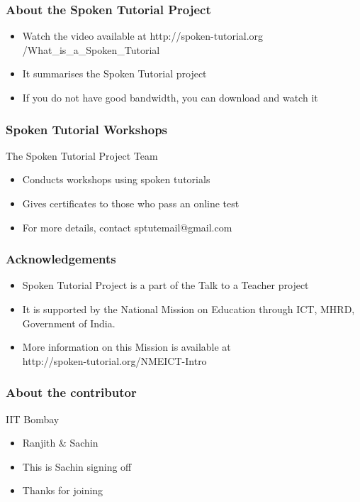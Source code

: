 \documentclass[17pt]{beamer}
\begin{document}


\begin{frame}
  \frametitle{About the Spoken Tutorial Project}
  \begin{itemize}
  \item Watch the video available at {\color{blue}
    http://spoken-tutorial.org /What\_is\_a\_Spoken\_Tutorial}
  \item It summarises the Spoken Tutorial project \pause
  \item If you do not have good bandwidth, you can download and watch it
  \end{itemize}
\end{frame}

\begin{frame}
  \frametitle{Spoken Tutorial Workshops}
  The Spoken Tutorial Project Team
  \begin{itemize}
  \item Conducts workshops using spoken tutorials
  \item Gives certificates to those who pass an online test
  \item For more details, contact sptutemail@gmail.com
  \end{itemize}
\end{frame}

\begin{frame}
  \frametitle{Acknowledgements}
  \begin{itemize}
  \item Spoken Tutorial Project is a part of the Talk to a Teacher
    project
  \item It is supported by the National Mission on Education through
    ICT, MHRD, Government of India.
  \item More information on this Mission is available at \\
    \small {\color{blue} http://spoken-tutorial.org/NMEICT-Intro}
  \end{itemize}
\end{frame}

\begin{frame}
  \frametitle{About the contributor}
  IIT Bombay
  \begin{itemize}[<+-|alert@+>]
  \item Ranjith \& Sachin 
  \item This is Sachin signing off 
  \item Thanks for joining
  \end{itemize}
\end{frame}
\end{document}
